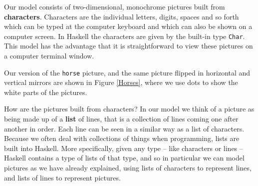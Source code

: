 Our model consists of two-dimensional, monochrome pictures built 
from \textbf{characters}.
Characters are the individual letters,
digits, spaces and so forth which can be typed at the computer keyboard and which 
can also be shown on a computer screen. In Haskell the characters are
given by the built-in type
\texttt{Char}. 
This model has the advantage that it is straightforward to view these
pictures on a computer terminal window. 


Our version of the \texttt{horse} picture, and the same picture
flipped in horizontal and vertical mirrors are shown in Figure \ref{Horses},
where we use dots to show the white parts of the pictures.

How are the pictures built from characters? In our model we think of
a picture as being made up of
a \textbf{list} of lines, that is a collection of
lines coming one after another in order. Each line can be seen in a similar way
as a list of characters. Because we often deal with collections of things when programming, 
lists are built into Haskell. More specifically, given any type -- like characters or lines
-- Haskell contains a type of lists of that type, and so in particular we can model pictures
as we have already explained, using lists of characters
to represent lines, and lists of lines to represent pictures.


